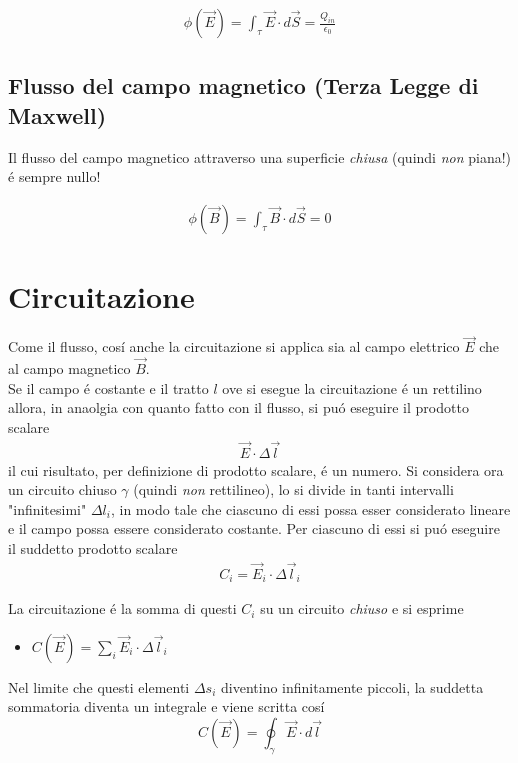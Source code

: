 \documentclass[17pt]{article}
\begin{document}
\begin{eqnarray}
	\phi(\vec{E}) = \int_{\tau}\vec{E}\cdot d\vec{S} = \frac{Q_{in}}{\epsilon_0}
\end{eqnarray}

\subsection{Flusso del campo magnetico (Terza Legge di Maxwell)}

Il flusso del campo magnetico attraverso una superficie \emph{chiusa} (quindi \emph{non} piana!) \'e sempre nullo!

\begin{eqnarray}
	\phi(\vec{B}) = \int_{\tau}\vec{B}\cdot d\vec{S} = 0
\end{eqnarray}


\section{Circuitazione}

Come il flusso, cos\'i anche la circuitazione si applica sia al campo elettrico $\vec{E}$ che al campo magnetico $\vec{B}$. \\
Se il campo \'e costante e il tratto $l$ ove si esegue la circuitazione \'e un rettilino allora, in anaolgia con quanto fatto con il flusso, si pu\'o eseguire il prodotto scalare
\begin{eqnarray}
	\vec{E}\cdot \Delta\vec{l}
\end{eqnarray}
il cui risultato, per definizione di prodotto scalare, \'e un numero. Si considera ora un circuito chiuso $\gamma$ (quindi \emph{non} rettilineo), lo si divide in tanti intervalli "infinitesimi" $\Delta l_i$, in modo tale che ciascuno di essi possa esser considerato lineare e il campo possa essere considerato costante. Per ciascuno di essi si pu\'o eseguire il suddetto prodotto scalare 
\begin{eqnarray}
	C_i = \vec{E}_i\cdot\Delta \vec{l}_i
\end{eqnarray}
 

La circuitazione \'e la somma di questi $C_i$ su un circuito \emph{chiuso} e si esprime
\begin{itemize}
	\item $ C(\vec{E}) = \sum_i  \vec{E}_i\cdot\Delta \vec{l}_i$
\end{itemize}

Nel limite che questi elementi $\Delta s_i$ diventino infinitamente piccoli, la suddetta sommatoria diventa un integrale e viene scritta cos\'i
$$
C(\vec{E}) = \oint_{\gamma} \vec{E}\cdot d\vec{l}
$$
\end{document}
